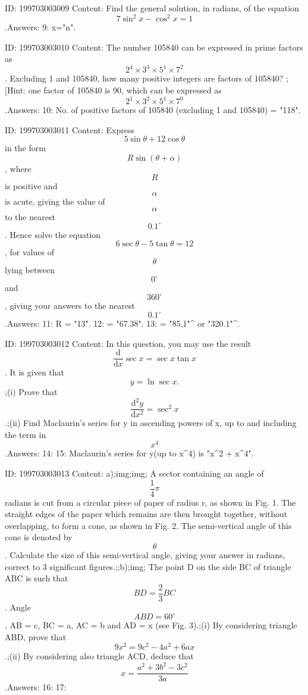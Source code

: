 \documentclass{article}
\begin{document}
ID: 199703003009
Content:
Find the general solution, in radians, of the equation \[7\sin^{2}x - \cos^{2}x = 1\].Answers:
9: x="n\pi \pm {}\pi".

ID: 199703003010
Content:
The number 105840 can be expressed in prime factors as \[2^{4} \times 3^{3} \times 5^{1} \times 7^{2}\]. Excluding 1 and 105840, how many positive integers are factors of 105840? ;[Hint: one factor of 105840 is 90, which can be expressed as \[2^{1} \times 3^{2} \times 5^{1} \times 7^{0}\].Answers:
10: No. of positive factors of 105840 (excluding 1 and 105840) = "118".

ID: 199703003011
Content:
Express \[5\sin\theta + 12\cos\theta\] in the form \[R\sin(\theta + \alpha)\], where \[R\] is positive and \[\alpha\] is acute, giving the value of \[\alpha\] to the nearest \[0.1^\circ\]. Hence solve the equation \[6\sec\theta - 5\tan\theta = 12\], for values of \[\theta\] lying between \[0^\circ\] and \[360^\circ\], giving your answers to the nearest  \[0.1^\circ\].Answers:
11: R = "13".
12: \alpha = "67.38".
13: \theta = "85.1"^{\circ} or "320.1"^{\circ}.

ID: 199703003012
Content:
In this question, you may use the result \[\frac{\mathrm{d} }{\mathrm{d} x} \sec x = \sec x \tan x\]. It is given that \[y = \ln \sec x.\];(i) Prove that \[\frac{\mathrm{d}^{2} y}{\mathrm{d} x^{2}} = \sec^{2}x\].;(ii) Find Maclaurin's series for y in ascending powers of x, up to and including the term in \[x^{4}\].Answers:
14: 
15: Maclaurin's series for y(up to x^4) is "x^2 + x^4".

ID: 199703003013
Content:
a);img;img; A sector containing an angle of \[\frac{1}{4}\pi\] radians is cut from a circular piece of paper of radius r, as shown in Fig. 1. The straight edges of the paper which remains are then brought together, without overlapping, to form a cone, as shown in Fig. 2. The semi-vertical angle of this cone is denoted by \[\theta\]. Calculate the size of this semi-vertical angle, giving your answer in radians, correct to 3 significant figures.;;b);img; The point D on the side BC of triangle ABC is such that \[BD = \frac{2}{3} BC\]. Angle \[ABD = 60^\circ\], AB = c, BC = a, AC = b and AD = x (see Fig. 3).;(i) By considering triangle ABD, prove that \[9x^{2} = 9c^{2} - 4a^{2} + 6ax\].;(ii) By considering also triangle ACD, deduce that \[x = \frac{a^{2} + 3b^{2} - 3c^{2}}{3a}\].Answers:
16: 
17: 
\end{document}
